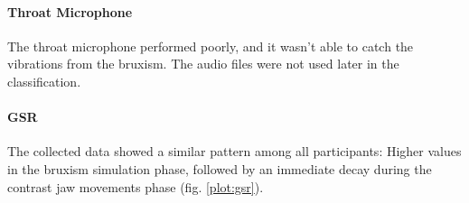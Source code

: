 \paragraph{Throat Microphone}

The throat microphone performed poorly, and it wasn't able to catch the vibrations from the bruxism. The audio files were not used later in the classification.

\paragraph{GSR}

The collected data showed a similar pattern among all participants: Higher values in the bruxism simulation phase, followed by an immediate decay during the contrast jaw movements phase (fig. \ref{plot:gsr}).
